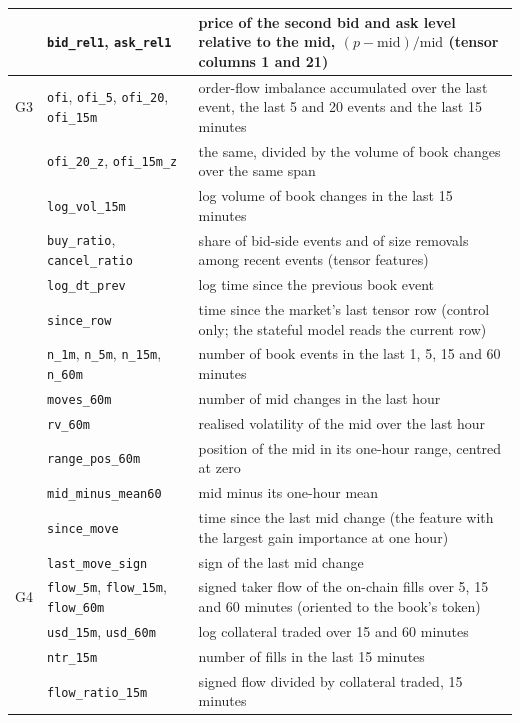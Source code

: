 \begin{footnotesize}
\begin{longtable}{llp{7.3cm}}
   & \texttt{bid\_rel1}, \texttt{ask\_rel1} & price of the second bid and ask level relative to the mid, $(p - \mathrm{mid})/\mathrm{mid}$ (tensor columns 1 and 21) \\
\midrule
G3 & \texttt{ofi}, \texttt{ofi\_5}, \texttt{ofi\_20}, \texttt{ofi\_15m} & order-flow imbalance accumulated over the last event, the last 5 and 20 events and the last 15 minutes \\
   & \texttt{ofi\_20\_z}, \texttt{ofi\_15m\_z} & the same, divided by the volume of book changes over the same span \\
   & \texttt{log\_vol\_15m} & log volume of book changes in the last 15 minutes \\
   & \texttt{buy\_ratio}, \texttt{cancel\_ratio} & share of bid-side events and of size removals among recent events (tensor features) \\
   & \texttt{log\_dt\_prev} & log time since the previous book event \\
   & \texttt{since\_row} & time since the market's last tensor row (control only; the stateful model reads the current row) \\
   & \texttt{n\_1m}, \texttt{n\_5m}, \texttt{n\_15m}, \texttt{n\_60m} & number of book events in the last 1, 5, 15 and 60 minutes \\
   & \texttt{moves\_60m} & number of mid changes in the last hour \\
   & \texttt{rv\_60m} & realised volatility of the mid over the last hour \\
   & \texttt{range\_pos\_60m} & position of the mid in its one-hour range, centred at zero \\
   & \texttt{mid\_minus\_mean60} & mid minus its one-hour mean \\
   & \texttt{since\_move} & time since the last mid change (the feature with the largest gain importance at one hour) \\
   & \texttt{last\_move\_sign} & sign of the last mid change \\
\midrule
G4 & \texttt{flow\_5m}, \texttt{flow\_15m}, \texttt{flow\_60m} & signed taker flow of the on-chain fills over 5, 15 and 60 minutes (oriented to the book's token) \\
   & \texttt{usd\_15m}, \texttt{usd\_60m} & log collateral traded over 15 and 60 minutes \\
   & \texttt{ntr\_15m} & number of fills in the last 15 minutes \\
   & \texttt{flow\_ratio\_15m} & signed flow divided by collateral traded, 15 minutes \\

\end{longtable}
\end{footnotesize}
